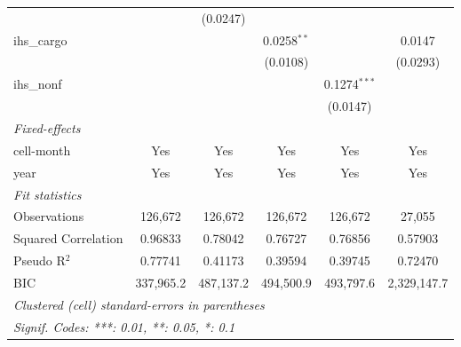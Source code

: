\begin{tabular}{lccccc}
                                           &                 & (0.0247)        &                 &                 &   \\   
   ihs\_cargo                              &                 &                 & 0.0258$^{**}$   &                 & 0.0147\\   
                                           &                 &                 & (0.0108)        &                 & (0.0293)\\   
   ihs\_nonf                               &                 &                 &                 & 0.1274$^{***}$  &   \\   
                                           &                 &                 &                 & (0.0147)        &   \\   
   \midrule
   \emph{Fixed-effects}\\
   cell-month                              & Yes             & Yes             & Yes             & Yes             & Yes\\  
   year                                    & Yes             & Yes             & Yes             & Yes             & Yes\\  
   \midrule
   \emph{Fit statistics}\\
   Observations                            & 126,672         & 126,672         & 126,672         & 126,672         & 27,055\\  
   Squared Correlation                     & 0.96833         & 0.78042         & 0.76727         & 0.76856         & 0.57903\\  
   Pseudo R$^2$                            & 0.77741         & 0.41173         & 0.39594         & 0.39745         & 0.72470\\  
   BIC                                     & 337,965.2       & 487,137.2       & 494,500.9       & 493,797.6       & 2,329,147.7\\  
   \midrule \midrule
   \multicolumn{6}{l}{\emph{Clustered (cell) standard-errors in parentheses}}\\
   \multicolumn{6}{l}{\emph{Signif. Codes: ***: 0.01, **: 0.05, *: 0.1}}\\
\end{tabular}
\par\endgroup


